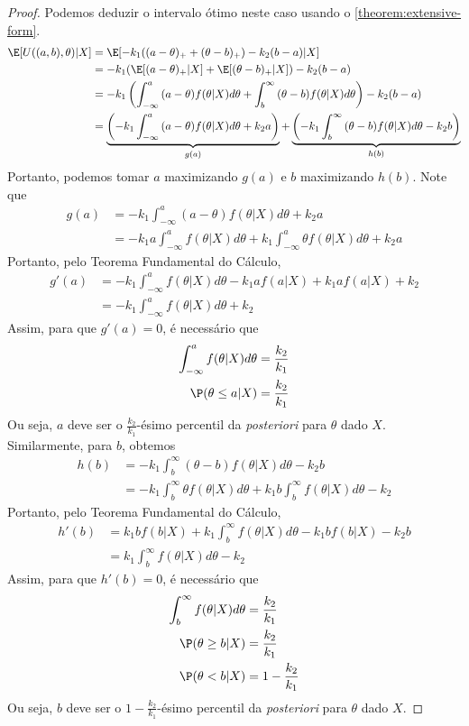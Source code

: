\begin{proof}
Podemos deduzir o intervalo ótimo neste caso
usando o \cref{theorem:extensive-form}. 
\begin{align*}
\E[U((a,b),\theta)|X]	
&= \E[-k_{1}((a-\theta)_{+} +(\theta-b)_{+}) 
-k_{2}(b-a)|X] \\
&= -k_{1}(\E[(a-\theta)_{+}|X]+\E[(\theta-b)_{+}|X]) 
-k_{2}(b-a) \\
&= -k_{1}\left(\int_{-\infty}^{a}{(a-\theta)f(\theta|X)d\theta}
+\int_{b}^{\infty}{(\theta-b)f(\theta|X)d\theta}\right)
-k_{2}(b-a) \\
&=  \underbrace{\left(-k_{1}\int_{-\infty}^{a}{(a-\theta)f(\theta|X)d\theta}+k_{2}a\right)}_{g(a)} + \underbrace{\left(-k_{1}\int_{b}^{\infty}{(\theta-b)f(\theta|X)d\theta}-k_{2}b\right)}_{h(b)}
\end{align*}
Portanto, podemos tomar $a$ maximizando $g(a)$ e
$b$ maximizando $h(b)$.
Note que
\begin{align*}
g(a)	
&= -k_{1}\int_{-\infty}^{a}{(a-\theta)f(\theta|X)d\theta}+k_{2}a \\
&= -k_{1}a\int_{-\infty}^{a}{f(\theta|X)d\theta}+k_{1}\int_{-\infty}^{a}{\theta f(\theta|X)d\theta}+k_{2}a
\end{align*}
Portanto, pelo Teorema Fundamental do Cálculo,
\begin{align*}
g'(a)	&= -k_{1}\int_{-\infty}^{a}{f(\theta|X)d\theta} -k_{1}af(a|X) +k_{1}af(a|X) + k_{2} \\
&= -k_{1}\int_{-\infty}^{a}{f(\theta|X)d\theta} + k_{2}
\end{align*}
Assim, para que $g'(a) = 0$, é necessário que
\begin{align*}
\int_{-\infty}^{a}{f(\theta|X)d\theta}
&= \frac{k_{2}}{k_{1}} \\
\P(\theta \leq a|X)
&= \frac{k_{2}}{k_{1}}
\end{align*}
Ou seja, $a$ deve ser o 
$\frac{k_2}{k_1}$-ésimo percentil da 
\emph{posteriori} para $\theta$ dado $X$.
Similarmente, para $b$, obtemos 
\begin{align*}
h(b)	
&= -k_{1}\int_{b}^{\infty}
{(\theta-b)f(\theta|X)d\theta}-k_{2}b	\\
&= -k_{1}\int_{b}^{\infty}{\theta f(\theta|X)d\theta}
+k_{1}b\int_{b}^{\infty}{f(\theta|X)d\theta} -k_{2}
\end{align*}
Portanto, pelo Teorema Fundamental do Cálculo,
\begin{align*}
h'(b)	&= k_{1}bf(b|X)+k_{1}\int_{b}^{\infty}{f(\theta|X)d\theta}-k_{1}bf(b|X) - k_{2}b \\
&= k_{1}\int_{b}^{\infty}{f(\theta|X)d\theta} -k_{2}
\end{align*}
Assim, para que $h'(b) = 0$, é necessário que
\begin{align*}
\int_{b}^{\infty}{f(\theta|X)d\theta}
&= \frac{k_2}{k_1} \\
\P(\theta \geq b|X)
&= \frac{k_2}{k_1} \\
\P(\theta < b|X)										
&= 1-\frac{k_2}{k_1}
\end{align*}
Ou seja, $b$ deve ser o 
$1-\frac{k_2}{k_1}$-ésimo percentil da 
\emph{posteriori} para $\theta$ dado $X$.
\end{proof}
